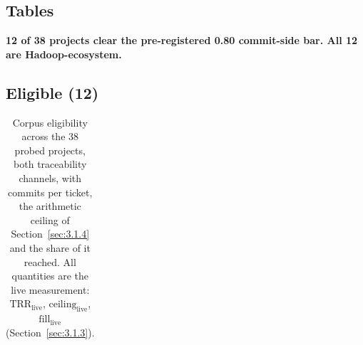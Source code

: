 \documentclass[conference]{IEEEtran}
\begin{document}
\begin{landscape}

\section*{Tables}




\textbf{12 of 38 projects clear the pre-registered 0.80 commit-side bar. All 12 are Hadoop-ecosystem.}



\subsection*{Eligible (12)}




\begingroup\scriptsize\setlength{\tabcolsep}{3pt}

\begin{longtable}{>{\raggedright\arraybackslash}p{}>{\raggedright\arraybackslash}p{}>{\raggedright\arraybackslash}p{}>{\raggedright\arraybackslash}p{}>{\raggedright\arraybackslash}p{}>{\raggedright\arraybackslash}p{}>{\raggedright\arraybackslash}p{}>{\raggedright\arraybackslash}p{}>{\raggedright\arraybackslash}p{}>{\raggedright\arraybackslash}p{}>{\raggedright\arraybackslash}p{}>{\raggedright\arraybackslash}p{}>{\raggedright\arraybackslash}p{}}

\caption{Corpus eligibility across the 38 probed projects, both traceability channels, with commits per ticket, the arithmetic ceiling of Section~\ref{sec:3.1.4} and the share of it reached. All quantities are the live measurement: $\mathrm{TRR}_\mathrm{live}$, $\mathrm{ceiling}_\mathrm{live}$, $\mathrm{fill}_\mathrm{live}$ (Section~\ref{sec:3.1.3}).}\label{tab:eligibility}\\


\end{longtable}
\end{landscape}
\end{document}
